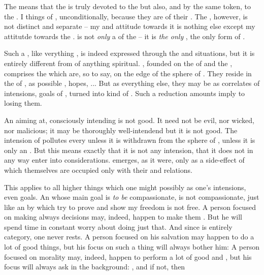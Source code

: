 \pa The  means that the  is truly devoted
to the  but also, and by the same token, to the . 
I  things of , unconditionally, 
because they are  of their .
The 
, however, is not distinct and separate -- my 
 and attitude towards it is nothing else except my 
attitutde towards the .  is not {\em only}
a  of the  -- it is {\em the only} , the
only form of .

Such a , like verything , is indeed
expressed through the  and situations, but it is
entirely different from  of anything spiritual.
, founded on the  of
 and the  \sch, comprises the 
which are, so to say, on the edge of the sphere of .
They reside in the  of , as possible
,  hopes, ...  But as
everything else, they may be  as correlates of 
intensions, goals of , turned into kind of .
Such a reduction amounts imply to losing them.



\pa An  aiming at, consciously intending  is not
good.  It need not be evil, nor wicked, nor malicious; it may be
thoroughly well-intendend but it is not good. The intension of
 pollutes every  unless it is withdrawn from
the sphere of , unless it is only an . But this means exactly that it is not any intension, that it
does not in any way enter into  considerations.   emerges, as it were, only as a side-effect of  which
themselves are occupied only with their   and
 relations.

This applies to all higher things which one might possibly  as
one's intensions, even goals.
 An   
whose main goal is {\em to be} compassionate, is not 
compassionate, just like an  by which  try to prove and 
show my freedom is not free. 
A person focused on making always 
decisions may, indeed, happen to make them . But he will spend time
in constant worry about doing just that. And since  is entirely
 category, one never rests. A person focused on his salvation may
happen to do a lot of good things, but his focus on such a thing will always
bother him:  A person focused on
morality may, indeed, happen to perform a lot of good  and ,
but his focus will always ask in the background: ,
and if not, then 

